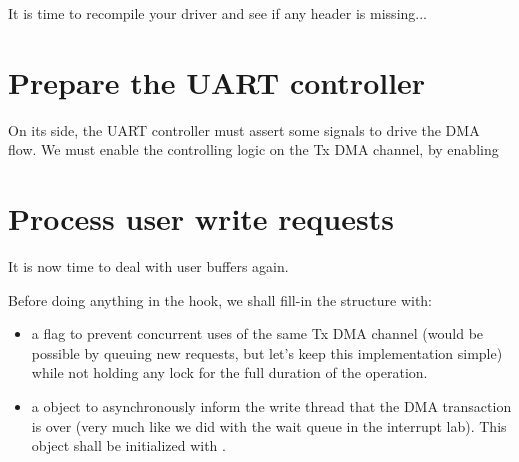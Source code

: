 It is time to recompile your driver and see if any header is missing...

\section{Prepare the UART controller}

On its side, the UART controller must assert some signals to drive the DMA
flow. We must enable the controlling logic on the Tx DMA channel, by enabling
\if{}\fi

\section{Process user write requests}

It is now time to deal with user buffers again.

Before doing anything in the  hook, we shall fill-in the
 structure with:
\begin{itemize}
\item a  flag to prevent concurrent uses of the same
  Tx DMA channel (would be possible by queuing new requests, but let's keep this
  implementation simple) while not holding any lock for the full duration of
  the operation.
\item a  object to asynchronously inform the
  write thread that the DMA transaction is over (very much like we did with the
  wait queue in the interrupt lab). This object shall be initialized with
  .
\end{itemize}

\if{}\fi

